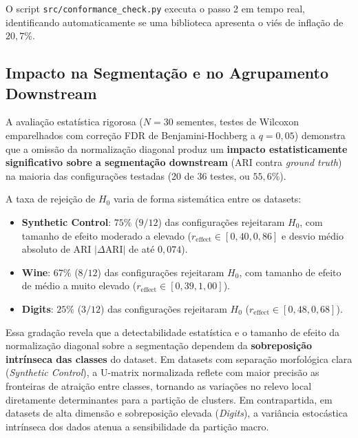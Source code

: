 \documentclass[10pt,journal,compsoc,twocolumn]{IEEEtran}
\begin{document}
O script \texttt{src/conformance\_check.py} executa o passo 2 em tempo real,
identificando automaticamente se uma biblioteca apresenta o vi\'es de infla\c{c}\~ao de $20{,}7\%$.

\subsection{Impacto na Segmenta\c{c}\~ao e no Agrupamento Downstream}
\label{subsec:disc_downstream}
A avalia\c{c}\~ao estat\'istica rigorosa ($N=30$ sementes, testes de Wilcoxon
emparelhados com corre\c{c}\~ao FDR de Benjamini-Hochberg a $q=0{,}05$) demonstra
que a omiss\~ao da normaliza\c{c}\~ao diagonal produz um \textbf{impacto
estatisticamente significativo sobre a segmenta\c{c}\~ao downstream} (ARI
contra \textit{ground truth}) na maioria das configura\c{c}\~oes testadas
(20 de 36 testes, ou $55{,}6\%$).

A taxa de rejei\c{c}\~ao de $H_0$ varia de forma sistem\'atica entre os datasets:
\begin{itemize}
    \item \textbf{Synthetic Control}: $75\%$ ($9/12$) das configura\c{c}\~oes
    rejeitaram $H_0$, com tamanho de efeito moderado a elevado
    ($r_\text{effect} \in [0{,}40, 0{,}86]$ e desvio m\'edio absoluto de ARI
    $|\Delta\text{ARI}|$ de at\'e $0{,}074$).
    \item \textbf{Wine}: $67\%$ ($8/12$) das configura\c{c}\~oes rejeitaram $H_0$,
    com tamanho de efeito de m\'edio a muito elevado ($r_\text{effect} \in [0{,}39, 1{,}00]$).
    \item \textbf{Digits}: $25\%$ ($3/12$) das configura\c{c}\~oes rejeitaram $H_0$
    ($r_\text{effect} \in [0{,}48, 0{,}68]$).
\end{itemize}

Essa grada\c{c}\~ao revela que a detectabilidade estat\'istica e o tamanho de efeito
da normaliza\c{c}\~ao diagonal sobre a segmenta\c{c}\~ao dependem da
\textbf{sobreposi\c{c}\~ao intr\'inseca das classes} do dataset. Em datasets com
separa\c{c}\~ao morfol\'ogica clara (\textit{Synthetic Control}), a U-matrix
normalizada reflete com maior precis\~ao as fronteiras de atrai\c{c}\~ao entre
classes, tornando as varia\c{c}\~oes no relevo local diretamente determinantes
para a parti\c{c}\~ao de clusters. Em contrapartida, em datasets de alta dimens\~ao
e sobreposi\c{c}\~ao elevada (\textit{Digits}), a vari\^ancia estoc\'astica
intr\'inseca dos dados atenua a sensibilidade da parti\c{c}\~ao macro.
\end{document}
